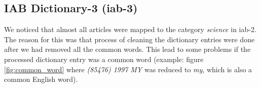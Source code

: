 \subsection{IAB Dictionary-3 (iab-3)}
We noticed that almost all articles were mapped to the category \emph{science} in iab-2. The reason for this was that process of cleaning the dictionary entries were done after we had removed all the common words. This lead to some problems if the processed dictionary entry was a common word (example: figure \ref{fig:common_word} where \emph{(85476) 1997 MY} was reduced to \emph{my}, which is also a common English word). 


